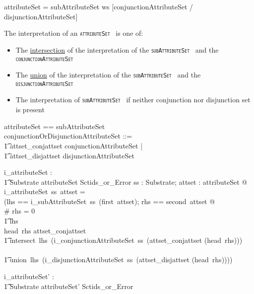 \documentclass{article}
\def\spec#1{{\tt \small \textsc{{#1}} }}
\def\bnf#1{{\scriptsize {{#1}} }}
\begin{document}
\begin{framed}
\noindent
\bnf{attributeSet = subAttributeSet ws [conjunctionAttributeSet / disjunctionAttributeSet]}
\end{framed}

The interpretation of an \spec{attributeSet} is one of:
\begin{itemize}[noitemsep,nolistsep]
\item The \underline{intersection} of the interpretation of the \spec{subAttributeSet} and the \spec{conjunctionAttributeSet}
\item The \underline{union} of the interpretation of the \spec{subAttributeSet} and the \spec{disjunctionAttributeSet}
\item The interpretation of  \spec{subAttributeSet} if neither conjunction nor disjunction set is present
\end{itemize}


\begin{zed}
attributeSet == subAttributeSet \cross \optional[conjunctionOrDisjunctionAttributeSet] \\
[attributeSet']
\also
conjunctionOrDisjunctionAttributeSet ::= \\
\t1 attset\_conjattset \ldata conjunctionAttributeSet \rdata | \\
\t1 attset\_disjattset \ldata disjunctionAttributeSet \rdata
\end{zed}

\begin{axdef}
   i\_attributeSet : \\
\t1 Substrate \fun attributeSet \fun Sctids\_or\_Error
\where
   \forall ss : Substrate; attset : attributeSet @ \\
   i\_attributeSet~ss~attset = \\
   (\LET lhs == i\_subAttributeSet~ss~(first~attset); rhs == second~attset @ \\
 \IF \# rhs = 0 \THEN \\
 \t1 lhs \\
 \ELSE \IF head~rhs \in \ran attset\_conjattset \THEN \\
 \t1  intersect~lhs~(i\_conjunctionAttributeSet~ss~(attset\_conjattset \inv (head~rhs))) \\
  \ELSE \\
  \t1 union~lhs~(i\_disjunctionAttributeSet~ss~(attset\_disjattset \inv (head~rhs))))
\end{axdef}

\begin{axdef}
   i\_attributeSet' : \\
\t1 Substrate \fun attributeSet' \fun Sctids\_or\_Error
\end{axdef}
\end{document}
